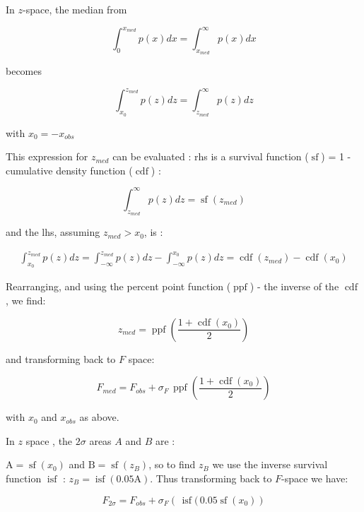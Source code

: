\documentclass[fleqn,usenatbib]{mnras}  %
\DeclareMathOperator\cdf{cdf}
\DeclareMathOperator\sf{sf}
\DeclareMathOperator\isf{isf}
\DeclareMathOperator\ppf{ppf}
\begin{document}
In $z$-space, the median from 

\begin{equation}
\int_{0}^{x_{med}} {p(x)dx} = \int_{x_{med}}^{\infty} {p(x)dx}
\end{equation}
 
becomes 

\begin{equation}
\int_{x_{0}}^{z_{med}}{p(z)dz} = \int_{z_{med}}^{\infty}{p(z)dz}
\end{equation}

with  $x_{0}=-x_{obs}$

This expression for $z_{med}$ can be evaluated : rhs is  a survival function ($\sf$) = 1 - cumulative density function ($\cdf$) : 

\begin{equation}
\int_{z_{med}}^{\infty}{p(z)dz} = \sf(z_{med})
\end{equation}

and the lhs, assuming $z_{med} > x_{0}$, is :

\begin{multline}
\int_{x_{0}}^{z_{med}}{p(z)dz} = \int_{-\infty}^{z_{med}}{p(z)dz} - \int_{-\infty}^{x_{0}}{p(z)dz} = \cdf(z_{med}) - \cdf(x_{0})
\end{multline}

Rearranging, and using the percent point function ($\ppf$) - the inverse of the $\cdf$, we find:

\begin{equation}
z_{med} = \ppf \left( \frac{1+\cdf(x_{0})}{2} \right)
\end{equation}

and transforming back to $F$ space: 

\begin{equation}
F_{med} = F_{obs} + \sigma_{F} \, \ppf \left( \frac{1+\cdf(x_{0})}{2} \right)
\end{equation}

with $x_{0}$ and $x_{obs}$ as above.  

In $z$  space , the $2\sigma$ areas  $A$ and $B$ are :

$\text{A} = \sf(x_{0})$ and $\text{B} = \sf(z_{B})$, so to find  $z_{B}$ we use the  inverse survival function $\isf$ : $z_{B} = \isf(0.05 \text{A})$. Thus transforming back to $F$-space we have:

\begin{equation}
F_{2\sigma} = F_{obs} + \sigma_{F} \left(\, \isf (\, 0.05 \sf (x_{0})  \right)
\end{equation}
\end{document}
